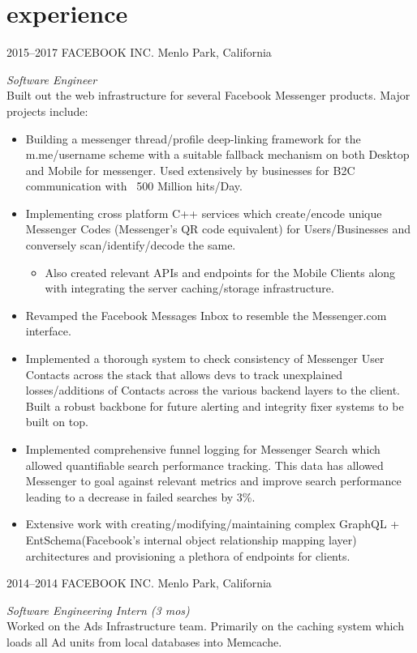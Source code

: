 \documentclass[print]{friggeri-cv} %
\begin{document}
\section{experience}
\begin{entrylist}
\entry
{2015--2017}
{FACEBOOK INC.}
{Menlo Park, California}
{\emph{Software Engineer} \\
Built out the web infrastructure for several Facebook Messenger products. Major projects include:

\begin{itemize}
\item Building a messenger thread/profile deep-linking framework for the m.me/{username} scheme with a suitable fallback mechanism on both Desktop and Mobile for messenger. Used extensively by businesses for B2C communication with ~500 Million hits/Day.
\item Implementing cross platform C++ services which create/encode unique Messenger Codes (Messenger's QR code equivalent) for Users/Businesses and conversely scan/identify/decode the same.
\begin{itemize}
\item Also created relevant APIs and endpoints for the Mobile Clients along with integrating the server caching/storage infrastructure.
\end{itemize}
\item Revamped the Facebook Messages Inbox to resemble the Messenger.com interface.
\item Implemented a thorough system to check consistency of Messenger User Contacts across the stack that allows devs to track unexplained losses/additions of Contacts across the various backend layers to the client. Built a robust backbone for future alerting and integrity fixer systems to be built on top.
\item Implemented comprehensive funnel logging for Messenger Search which allowed quantifiable search performance tracking. This data has allowed Messenger to goal against relevant metrics and improve search performance leading to a decrease in failed searches by 3\%.
\item Extensive work with creating/modifying/maintaining complex GraphQL + EntSchema(Facebook's internal object relationship mapping layer) architectures and provisioning a plethora of endpoints for clients.
\end{itemize}}

\entry
{2014--2014}
{FACEBOOK INC.}
{Menlo Park, California}
{\emph{Software Engineering Intern (3 mos)} \\
Worked on the Ads Infrastructure team. Primarily on the caching system which loads all Ad units from local databases into Memcache.

}
\end{entrylist}
\end{document}
